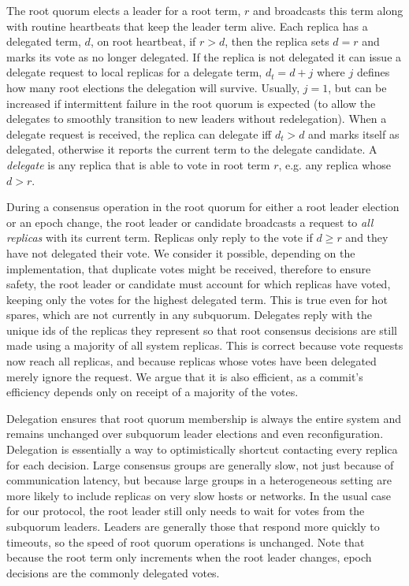 \documentclass[10pt,conference]{IEEEtran}
\newcommand{\roo}{root quorum\xspace}
\begin{document}
The \roo elects a leader for a root term, $r$ and broadcasts this term along with
routine heartbeats that keep the leader term alive.
Each replica has a delegated term, $d$, on root heartbeat, if $r>d$, then the replica
sets $d=r$ and marks its vote as no longer delegated.
If the replica is not delegated it can issue a delegate request to local replicas for a
delegate term, $d_t=d+j$ where $j$ defines how many root elections the delegation will
survive.
Usually, $j=1$, but can be increased if intermittent failure in the root quorum is
expected (to allow the delegates to smoothly transition to new leaders without
redelegation).
When a delegate request is received, the replica can delegate iff $d_t>d$ and marks
itself as delegated, otherwise it reports the current term to the delegate candidate.
A \emph{delegate} is any replica that is able to vote in root term $r$, e.g. any replica
whose $d>r$.

During a consensus operation in the \roo for either a root leader election or an epoch
change, the root leader or candidate broadcasts a request to \emph{all replicas} with
its current term.
Replicas only reply to the vote if $d \ge r$ and they have not delegated their vote.
We consider it possible, depending on the implementation, that duplicate votes might be
received, therefore to ensure safety, the root leader or candidate must account for
which replicas have voted, keeping only the votes for the highest delegated term.
This is true even for hot spares, which are not currently in any subquorum.
Delegates reply with the unique ids of the replicas they represent so that root
consensus decisions are still made using a majority of all system replicas.
This is correct because vote requests now reach all replicas, and because replicas whose
votes have been delegated merely ignore the request.
We argue that it is also efficient, as a commit's efficiency depends only on receipt of
a majority of the votes.

Delegation ensures that root quorum membership is always the entire system and remains
unchanged over subquorum leader elections and even reconfiguration.
Delegation is essentially a way to optimistically shortcut contacting every replica for
each decision.
Large consensus groups are generally slow, not just because of communication latency,
but because large groups in a heterogeneous setting are more likely to include replicas
on very slow hosts or networks.
In the usual case for our protocol, the root leader still only needs to wait for votes
from the subquorum leaders.
Leaders are generally those that respond more quickly to timeouts, so the speed of root
quorum operations is unchanged.
Note that because the root term only increments when the root leader changes,
epoch decisions are the commonly delegated votes.
\end{document}
